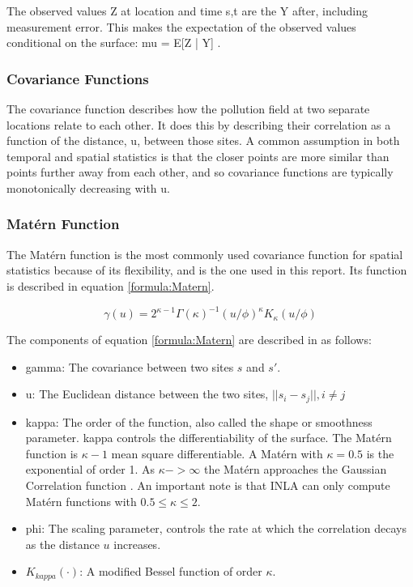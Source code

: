 \documentclass{article}
\begin{document}
	The observed values 
	\gls{Z} at location and time \gls{s,t} are the \gls{Y} after, including measurement error.  This makes the expectation of the observed values conditional on the surface:
	\gls{mu} = 
	E[\gls{Z} | \gls{Y}] 
	\citep{diggle:07}.
	
	\subsubsection*{Covariance Functions}
	\label{subsubsec:covariances}
	The covariance function describes how the pollution field at two separate locations relate to each other. It does this by describing their correlation as a function of the distance, \gls{u}, between those sites.  A common assumption in both temporal and spatial statistics is that the closer points are more similar than points further away from each other, and so covariance functions are typically monotonically decreasing with \gls{u}.
	
	\subsubsection*{Mat\'{e}rn Function} \label{subsubsec:MaternIntro}
	The Mat\'{e}rn function is the most commonly used covariance function for spatial statistics because of its flexibility, \citep{diggle:07} and is the one used in this report.  Its function is described in equation \ref{formula:Matern}.
	
	\begin{equation}  \label{formula:Matern}
		\gamma(u) = {2^{\kappa -1}\Gamma(\kappa)^{-1}(u/\phi)^{\kappa}K_{\kappa}(u/\phi)}
	\end{equation}
	
	The components of equation \ref{formula:Matern} are described in \cite{diggle:07} as follows:
	\begin{itemize}
		\item \gls{gamma}:  The covariance between two sites $s$ and $s'$.
		\item \gls{u}: The Euclidean distance between the two sites,  $||s_i - s_j||, i \neq j$
		\item \gls{kappa}: The order of the function, also called the shape or smoothness parameter.  \gls{kappa} controls the differentiability of the surface.  The Mat\'{e}rn function is $\kappa -1$ mean square differentiable.  A Mat\'{e}rn with $\kappa = 0.5$ is the exponential of order 1.  As $\kappa -> \infty$  the Mat\'{e}rn approaches the Gaussian Correlation function  \cite{diggle:07}.  An important note is that INLA can only compute Mat\'{e}rn functions with $0.5 \leq \kappa \leq 2$.
		\item \gls{phi}: The scaling parameter, controls the rate at which the correlation decays as the distance $u$ increases.
		\item $K_{kappa}(\cdot)$: A modified Bessel function of order $\kappa$.
	\end{itemize} 
	
\end{document}
